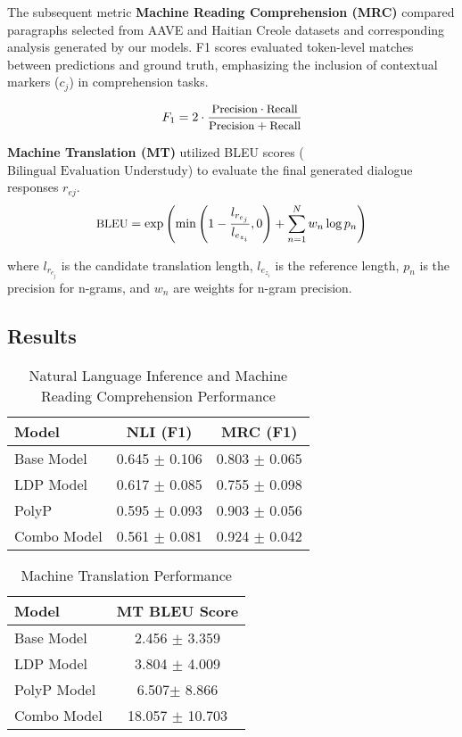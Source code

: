 The subsequent metric \textbf{Machine Reading Comprehension (MRC)} compared paragraphs selected from AAVE and Haitian Creole datasets and corresponding analysis generated by our models. F1 scores evaluated token-level matches between predictions and ground truth, emphasizing the inclusion of contextual markers (\(c_j\)) in comprehension tasks.

\[
\small
F_1 = 2 \cdot \frac{\text{Precision} \cdot \text{Recall}}{\text{Precision} + \text{Recall}}
\]

\textbf{Machine Translation (MT)} utilized BLEU scores (\(\text{Bilingual Evaluation Understudy}\)) to evaluate the final generated dialogue responses $r_{ej}$.
\[
\small
\text{BLEU} = \exp\left(\min\left(1 - \frac{l_{r_{e_j}}}{l_{e_{z_i}}}, 0\right) + \sum_{n=1}^N w_n \log p_n \right)
\]

where \(l_{r_{e_j}}\) is the candidate translation length, \(l_{e_{z_i}}
\) is the reference length, \(p_n\) is the precision for n-grams, and \(w_n\) are weights for n-gram precision.\\ 


\subsection{Results}
\begin{table}[H]
\centering
\begin{tabular}{|l|c|c|}
\hline
\textbf{Model} & \textbf{NLI (F1)} & \textbf{MRC (F1)} \\ \hline
Base Model & 0.645 $\pm $ 0.106 & 0.803 $\pm $ 0.065 \\ \hline
LDP Model & 0.617 $\pm $ 0.085 & 0.755 $\pm $ 0.098\\ \hline
PolyP & 0.595 $\pm $ 0.093 & 0.903 $\pm $ 0.056 \\ \hline
Combo Model & 0.561 $\pm $ 0.081 & 0.924 $\pm $ 0.042 \\ \hline
\end{tabular}
\caption{Natural Language Inference and Machine Reading Comprehension Performance}
\label{tab:model-performance}
\end{table}

\begin{table}[H]
\centering
\begin{tabular}{|l|c|}
\hline
\textbf{Model} & \textbf{MT BLEU Score} \\ \hline

Base Model & 2.456 $\pm $ 3.359 \\ \hline
LDP Model & 3.804 $\pm $ 4.009\\ \hline
PolyP Model & 6.507$\pm $ 8.866 \\ \hline
Combo Model & 18.057 $\pm $ 10.703\\ \hline

\end{tabular}
\caption{Machine Translation Performance}
\label{tab:mt-bleu-performance}
\end{table}

